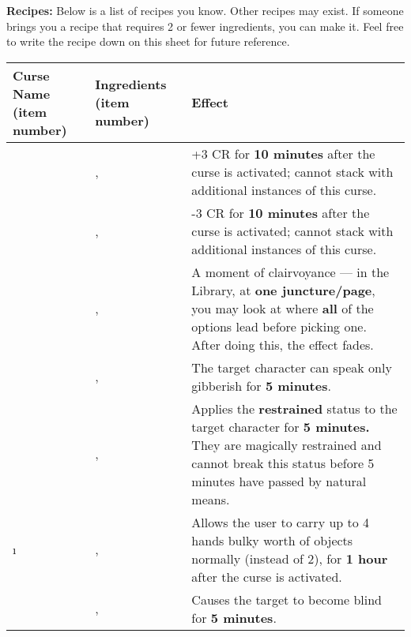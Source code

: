 \documentclass[green]{GL2020}
\begin{document}
\textbf{Recipes:}
Below is a list of recipes you know. Other recipes may exist. If someone brings you a recipe that requires 2 or fewer ingredients, you can make it. Feel free to write the recipe down on this sheet for future reference.

\begin{tabularx}{\textwidth}{| >{\centering\arraybackslash} m{4cm} | >{\centering\arraybackslash} m{4cm} | X |}
\hline
	\textbf{Curse Name (item number)} & \textbf{Ingredients (item number)}  & \textbf{Effect} \\
\hline
\hline
	\iCourage{}	&	\iMoonflower{}, \iLimestone{}   & +3 CR  for \textbf{10 minutes} after the curse is activated; cannot stack with additional instances of this curse.	\\
\hline
	\iWeakness{}	& \iNightshade{}, \iBlackCrocus{}   &	-3 CR  for \textbf{10 minutes} after the curse is activated; cannot stack with additional instances of this curse. \\
\hline	
	\iInsight{}	& \iMorningGlory{}, \iEagleFeather{}	& A moment of clairvoyance — in the Library, at \textbf{one juncture/page}, you may look at where \textbf{all} of the options lead before picking one. After doing this, the effect fades. \\
\hline	
	\iBabble{}	& \iClay{}, \iSpiderWeb{}	&	The target character can speak only gibberish for \textbf{5 minutes}. \\
\hline	
	\iRestraint{}	& \iSpiderWeb{}, \iLily{}	&	Applies the \textbf{restrained} status to the target character for \textbf{5 minutes.} They are magically restrained and cannot break this status before 5 minutes have passed by natural means.\\
\hline	
	\i {}	&	\iFlameOrchid{}, \iObsidian{} &	Allows the user to carry up to 4 hands bulky worth of objects normally (instead of 2), for \textbf{1 hour} after the curse is activated. \\
\hline	
	\iBlindness{}	&	\iMorningGlory{}, \iClay{} & Causes the target to become blind for \textbf{5 minutes}.\\
\hline	

\end{tabularx}
\end{document}
